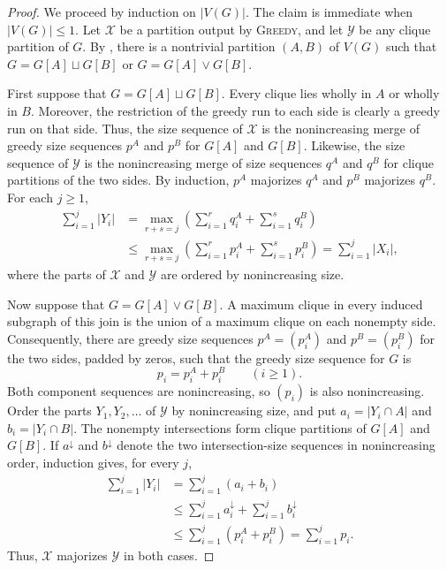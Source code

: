 \documentclass[a4paper,fleqn]{cas-sc}
\theoremstyle{remark}
\theoremstyle{plain}
\newcommand{\greedy}{{\textsc{Greedy}}}
\begin{document}
\begin{proof}
We proceed by induction on $|V(G)|$. The claim is immediate when
$|V(G)|\leq 1$. Let $\mathcal{X}$ be a partition output by \greedy{},
and let $\mathcal{Y}$ be any clique partition of $G$. By
, there is a nontrivial partition $(A,B)$
of $V(G)$ such that $G=G[A]\sqcup G[B]$ or
$G=G[A]\vee G[B]$.

First suppose that $G=G[A]\sqcup G[B]$. Every clique lies wholly in
$A$ or wholly in $B$. Moreover, the restriction of the greedy run to
each side is clearly a greedy run on that side. Thus, the
size sequence of $\mathcal{X}$ is the nonincreasing merge of greedy
size sequences $p^A$ and $p^B$ for $G[A]$ and $G[B]$. Likewise, the
size sequence of $\mathcal{Y}$ is the nonincreasing merge of size
sequences $q^A$ and $q^B$ for clique partitions of the two sides. By
induction, $p^A$ majorizes $q^A$ and $p^B$ majorizes $q^B$. For each
$j\geq 1$,
\begin{align*}
\sum_{i=1}^j |Y_i|
 &=\max_{r+s=j}\left(\sum_{i=1}^r q^A_i+
                         \sum_{i=1}^s q^B_i\right)\\
 &\leq\max_{r+s=j}\left(\sum_{i=1}^r p^A_i+
                         \sum_{i=1}^s p^B_i\right)
  =\sum_{i=1}^j |X_i|,
\end{align*}
where the parts of $\mathcal{X}$ and $\mathcal{Y}$ are ordered by
nonincreasing size.

Now suppose that $G=G[A]\vee G[B]$. A maximum clique in every induced
subgraph of this join is the union of a maximum clique on each
nonempty side. Consequently, there are greedy size sequences
$p^A=(p^A_i)$ and $p^B=(p^B_i)$ for the two sides, padded by zeros,
such that the greedy size sequence for $G$ is
\[
   p_i=p^A_i+p^B_i\qquad(i\geq 1).
\]
Both component sequences are nonincreasing, so $(p_i)$ is also
nonincreasing. Order the parts $Y_1,Y_2,\dots$ of $\mathcal{Y}$ by
nonincreasing size, and put $a_i=|Y_i\cap A|$ and
$b_i=|Y_i\cap B|$. The nonempty intersections form clique partitions
of $G[A]$ and $G[B]$. If $a^\downarrow$ and $b^\downarrow$ denote
the two intersection-size sequences in nonincreasing order, induction
gives, for every $j$,
  \begin{align*}
\sum_{i=1}^j |Y_i|
 &=\sum_{i=1}^j(a_i+b_i)\\
 &\leq \sum_{i=1}^j a^\downarrow_i+
       \sum_{i=1}^j b^\downarrow_i\\
 &\leq \sum_{i=1}^j(p^A_i+p^B_i)
 =\sum_{i=1}^j p_i.
  \end{align*}
Thus, $\mathcal{X}$ majorizes $\mathcal{Y}$ in both cases.
\end{proof}
\end{document}

